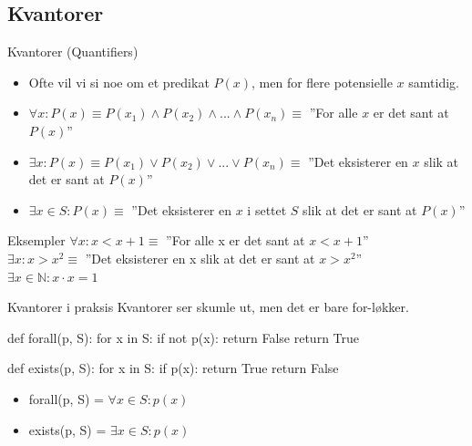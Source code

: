     \subsection{Kvantorer}

\begin{frame}{Kvantorer (Quantifiers)}
    \begin{itemize}
        \item Ofte vil vi si noe om et predikat $P(x)$, men for flere potensielle $x$ samtidig.
        \pause
        \item $\forall x : P(x) \equiv P(x_1) \land P(x_2) \land ... \land P(x_n) \equiv$ ''For alle $x$ er det sant at $P(x)$''
        \pause
        \item $\exists x : P(x) \equiv P(x_1) \lor P(x_2) \lor ... \lor P(x_n) \equiv$ ''Det eksisterer en $x$ slik at det er sant at $P(x)$''
        \pause
        \item $\exists x \in S : P(x) \equiv$ ''Det eksisterer en $x$ i settet $S$ slik at  det er sant at $P(x)$''
    \end{itemize}
    
    \pause

    \begin{block}{Eksempler}
        $\forall x : x < x + 1 \equiv$ ''For alle x er det sant at $x < x +1$''\\
        $\exists x : x > x^2 \equiv$ ''Det eksisterer en x slik at det er sant at $x > x^2$''\\
        $\exists x \in \mathbb{N} : x \cdot x = 1$\\
    \end{block}
\end{frame}

\begin{frame}[fragile]{Kvantorer i praksis}
    Kvantorer ser skumle ut, men det er bare for-løkker.
    \begin{python}
def forall(p, S):
    for x in S:
        if not p(x):
            return False
    return True
    
def exists(p, S):
    for x in S:
        if p(x):
            return True
    return False
    \end{python}
    
    \pause
    \begin{itemize}
        \item forall(p, S) = $\forall x \in S : p(x)$        
        \item exists(p, S) = $\exists x \in S : p(x)$
    \end{itemize}
\end{frame}

